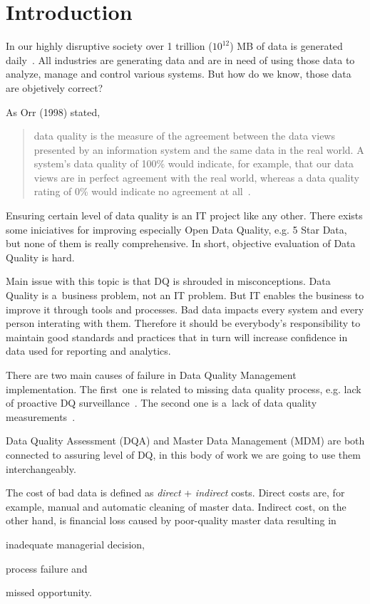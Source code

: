 \chapter{Introduction}\label{ch:introduction}

In our highly disruptive society over 1 trillion (\( 10^{12} \)) MB of data is generated daily~\cite{techjury2021}.
All industries are generating data and are in need of using those data to analyze, manage and control various systems.
But how do we know, those data are objetively correct?

As Orr (1998) stated,
\blockquote[][]{data quality is the measure of the agreement between the data views presented by an information system and the same data in the real world.
A system's data quality of 100\% would indicate, for example, that our data views are in perfect agreement with the real world, whereas a data quality rating of 0\% would indicate no agreement at all~\cite{orr1998}.}

Ensuring certain level of data quality is an IT project like any other.
There exists some iniciatives for improving especially Open Data Quality, e.g. 5 Star Data, but none of them is really comprehensive.
In short, objective evaluation of Data Quality is hard.

Main issue with this topic is that DQ is shrouded in misconceptions.
Data Quality is a~business problem, not an IT problem.
But IT enables the business to improve it through tools and processes.
Bad data impacts every system and every person interating with them.
Therefore it should be everybody's responsibility to maintain good standards and practices that in turn will increase confidence in data used for reporting and analytics.

There are two main causes of failure in Data Quality Management implementation.
The first~one is related to missing data quality process, e.g. lack of proactive DQ surveillance~\cite{risto2011}.
The second one is a~lack of data quality measurements~\cite{haug2013}.

Data Quality Assessment (DQA) and Master Data Management (MDM) are both connected to assuring level of DQ, in this body of work we are going to use them interchangeably.

The cost of bad data is defined as \textit{direct} + \textit{indirect} costs.
Direct costs are, for example, manual and automatic cleaning of master data.
Indirect cost, on the other hand, is financial loss caused by poor-quality master data resulting in
\begin{enumerate*}[label=(\roman*)]
    \item inadequate managerial decision,
    \item process failure and
    \item missed opportunity.
\end{enumerate*}

